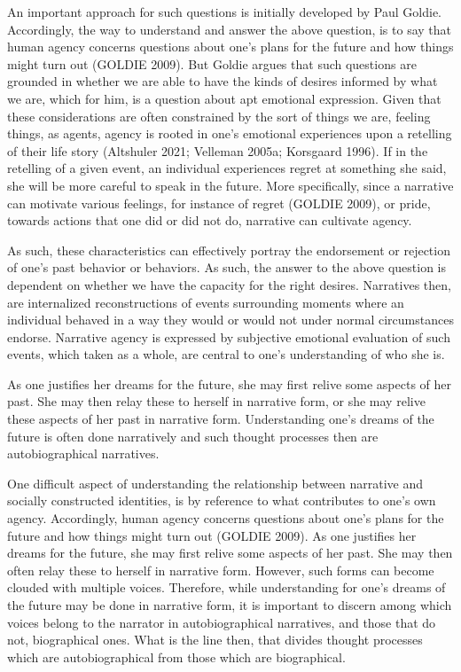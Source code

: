 \documentclass[12pt]{book}
\theoremstyle{definition}
\theoremstyle{remark}
\begin{document}
An important approach for such questions is initially developed by Paul Goldie. Accordingly, the way to understand and answer the above question, is to say that human agency concerns questions about one's plans for the future and how things might turn out (GOLDIE 2009). But Goldie argues that such questions are grounded in whether we are able to have the kinds of desires informed by what we are, which for him, is a question about apt emotional expression. Given that these considerations are often constrained by the sort of things we are, feeling things, as agents, agency is rooted in one's emotional experiences upon a retelling of their life story (Altshuler 2021; Velleman 2005a; Korsgaard 1996). If in the retelling of a given event, an individual experiences regret at something she said, she will be more careful to speak in the future. More specifically, since a narrative can motivate various feelings, for instance of regret (GOLDIE 2009), or pride, towards actions that one did or did not do, narrative can cultivate agency.

As such, these characteristics can effectively portray the endorsement or rejection of one's past behavior or behaviors. As such, the answer to the above question is dependent on whether we have the capacity for the right desires. Narratives then, are internalized reconstructions of events surrounding moments where an individual behaved in a way they would or would not under normal circumstances endorse. Narrative agency is expressed by subjective emotional evaluation of such events, which taken as a whole, are central to one's understanding of who she is.

As one justifies her dreams for the future, she may first relive some aspects of her past. She may then relay these to herself in narrative form, or she may relive these aspects of her past in narrative form. Understanding one's dreams of the future is often done narratively and such thought processes then are autobiographical narratives.

One difficult aspect of understanding the relationship between narrative and socially constructed identities, is by reference to what contributes to one's own agency. Accordingly, human agency concerns questions about one's plans for the future and how things might turn out (GOLDIE 2009). As one justifies her dreams for the future, she may first relive some aspects of her past. She may then often relay these to herself in narrative form. However, such forms can become clouded with multiple voices. Therefore, while understanding for one's dreams of the future may be done in narrative form, it is important to discern among which voices belong to the narrator in autobiographical narratives, and those that do not, biographical ones. What is the line then, that divides thought processes which are autobiographical from those which are biographical.
\end{document}

